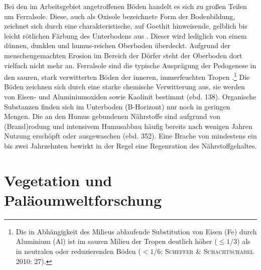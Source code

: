 Bei den im Arbeitsgebiet angetroffenen Böden handelt es sich zu großen Teilen um Ferralsole. Diese, auch als Oxisole bezeichnete Form der Bodenbildung, zeichnet sich durch eine charakteristische, auf Goethit hinweisende, gelblich bis leicht rötlichen Färbung des Unterbodens aus \parencites[351f., 355 Abb.~7.6-4]{Scheffer.2010}[144]{Jones.2013}. Dieser wird lediglich von einem dünnen, dunklen und humus-reichen Oberboden überdeckt. Aufgrund der menschengemachten Erosion im Bereich der Dörfer steht der Oberboden dort vielfach nicht mehr an. Ferralsole sind die typische Ausprägung der Pedogenese in den sauren, stark verwitterten Böden der inneren, immerfeuchten Tropen \parencite[27]{Scheffer.2010}.\footnote{Die in Abhängigkeit des Milieus ablaufende Substitution von Eisen (Fe) durch Aluminium (Al) ist im sauren Milieu der Tropen deutlich höher ($\leq1/3$) als in neutralen oder reduzierenden Böden ($<1/6$; \textsc{Scheffer \& Schachtschabel} 2010: 27).} Die Böden zeichnen sich durch eine starke chemische Verwitterung aus, sie werden von Eisen- und Aluminiumoxiden sowie Kaolinit bestimmt (ebd. 138). Organische Substanzen finden sich im Unterboden (B-Horizont) nur noch in geringen Mengen. Die an den Humus gebundenen Nährstoffe sind aufgrund von (Brand)rodung und intensivem Humusabbau häufig bereits nach wenigen Jahren Nutzung erschöpft oder ausgewaschen (ebd. 352). Eine Brache von mindestens ein bis zwei Jahrzehnten bewirkt in der Regel eine Regenration des Nährstoffgehaltes.


\section{Vegetation und Paläoumweltforschung}\label{sec:Palaeoumwelt}

